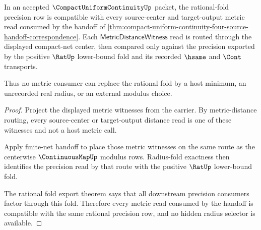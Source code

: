 \begin{theorem}
\label{thm:compact-uniform-continuity-rational-fold-metric-compatibility}
In an accepted $\CompactUniformContinuityUp$ packet, the rational-fold precision row is compatible with every source-center and target-output metric read consumed by the handoff of \autoref{thm:compact-uniform-continuity-four-source-handoff-correspondence}. Each $\mathsf{MetricDistanceWitness}$ read is routed through the displayed compact-net center, then compared only against the precision exported by the positive $\RatUp$ lower-bound fold and its recorded $\hsame$ and $\Cont$ transports.

Thus no metric consumer can replace the rational fold by a host minimum, an unrecorded real radius, or an external modulus choice.
\end{theorem}
\begin{proof}
Project the displayed metric witnesses from the carrier. By metric-distance routing, every source-center or target-output distance read is one of these witnesses and not a host metric call.

Apply finite-net handoff to place those metric witnesses on the same route as the centerwise $\ContinuousMapUp$ modulus rows. Radius-fold exactness then identifies the precision read by that route with the positive $\RatUp$ lower-bound fold.

The rational fold export theorem says that all downstream precision consumers factor through this fold. Therefore every metric read consumed by the handoff is compatible with the same rational precision row, and no hidden radius selector is available.
\end{proof}

